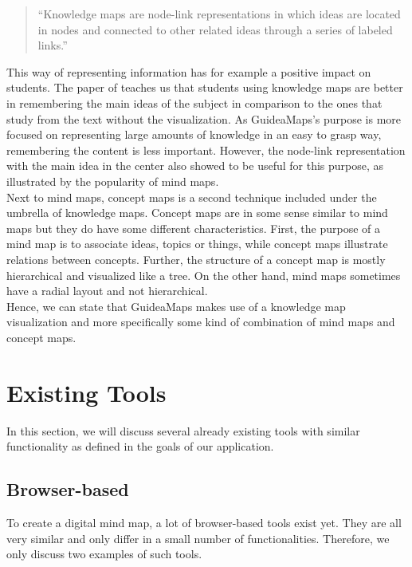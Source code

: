 \begin{quote}
``Knowledge maps are node-link representations in which ideas are located in nodes and connected to other related ideas through a series of labeled links.'' \hfill 
\end{quote}

This way of representing information has for example a positive impact on students. The paper of \cite{knowledgemapsodonnell} teaches us that students using knowledge maps are better in remembering the main ideas of the subject in comparison to the ones that study from the text without the visualization. As GuideaMaps's purpose is more focused on representing large amounts of knowledge in an easy to grasp way, remembering the content is less important. However, the node-link representation with the main idea in the center also showed to be useful for this purpose, as illustrated by the popularity of mind maps.\\

Next to mind maps, concept maps is a second technique included under the umbrella of knowledge maps. Concept maps are in some sense similar to mind maps but they do have some different characteristics. First, the purpose of a mind map is to associate ideas, topics or things, while concept maps illustrate relations between concepts. Further, the structure of a concept map is mostly hierarchical and visualized like a tree. On the other hand, mind maps sometimes have a radial layout and not hierarchical. \citep{davies} \\

Hence, we can state that GuideaMaps makes use of a knowledge map visualization and more specifically some kind of combination of mind maps and concept maps.



\section{Existing Tools}\label{sec:existing-tools}
In this section, we will discuss several already existing tools with similar functionality as defined in the goals of our application.

\subsection{Browser-based}
To create a digital mind map, a lot of browser-based tools exist yet. They are all very similar and only differ in a small number of functionalities. Therefore, we only discuss two examples of such tools.\\

